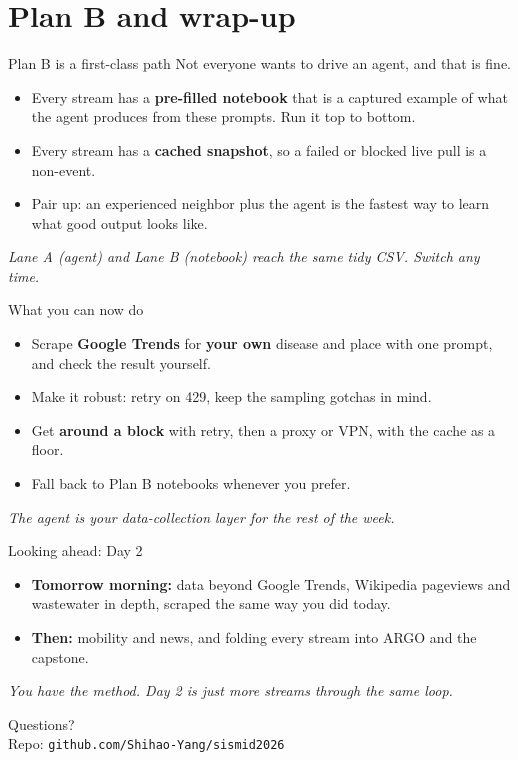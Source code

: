 \documentclass[aspectratio=169,11pt]{beamer}
\begin{document}
\section{Plan B and wrap-up}

\begin{frame}{Plan B is a first-class path}
  Not everyone wants to drive an agent, and that is fine.
  \begin{itemize}
    \item Every stream has a \textbf{pre-filled notebook} that is a captured example of what
          the agent produces from these prompts. Run it top to bottom.
    \item Every stream has a \textbf{cached snapshot}, so a failed or blocked live pull is a
          non-event.
    \item Pair up: an experienced neighbor plus the agent is the fastest way to learn what
          good output looks like.
  \end{itemize}
  \vspace{0.3em}
  \begin{center}
    \itshape Lane A (agent) and Lane B (notebook) reach the same tidy CSV. Switch any time.
  \end{center}
\end{frame}

\begin{frame}{What you can now do}
  \begin{itemize}
    \item Scrape \textbf{Google Trends} for \textbf{your own} disease and place with one
          prompt, and check the result yourself.
    \item Make it robust: retry on 429, keep the sampling gotchas in mind.
    \item Get \textbf{around a block} with retry, then a proxy or VPN, with the cache as a
          floor.
    \item Fall back to Plan B notebooks whenever you prefer.
  \end{itemize}
  \vfill
  \begin{center}
    \itshape The agent is your data-collection layer for the rest of the week.
  \end{center}
\end{frame}

\begin{frame}{Looking ahead: Day 2}
  \begin{itemize}
    \item \textbf{Tomorrow morning:} data beyond Google Trends, Wikipedia pageviews and
          wastewater in depth, scraped the same way you did today.
    \item \textbf{Then:} mobility and news, and folding every stream into ARGO and the
          capstone.
  \end{itemize}
  \vfill
  \begin{center}
    \itshape You have the method. Day 2 is just more streams through the same loop.
  \end{center}
\end{frame}

\begin{frame}[standout]
  Questions?\\[0.4em]
  \small Repo: \texttt{github.com/Shihao-Yang/sismid2026}
\end{frame}
\end{document}
